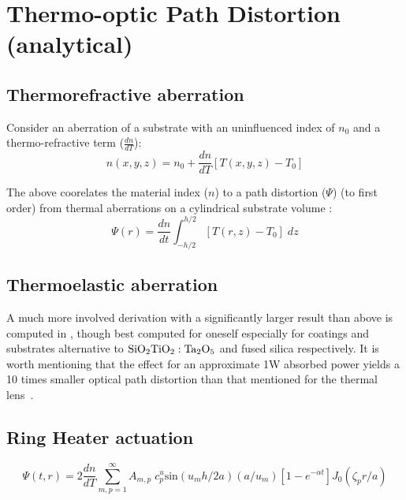 \section{Thermo-optic Path Distortion (analytical)}
\subsection{Thermorefractive aberration}
Consider an aberration of a substrate with an uninfluenced index of $n_0$ and a thermo-refractive term ($\frac{dn}{dT}$):
\begin{equation}
n(x,y,z) = n_0 + \frac{dn}{dT} [T(x,y,z) - T_0]
\end{equation}

The above coorelates the material index ($n$) to a path distortion ($\Psi$) (to first order) from thermal aberrations on a cylindrical substrate volume \cite{hellovinet:1990}:
\begin{equation}
    \Psi(r) = \frac{dn}{dt} \int^{h/2}_{-h/2} [T(r,z) - T_0] \;dz
\end{equation}

\subsection{Thermoelastic aberration}
A much more involved derivation with a significantly larger result than above is computed in \cite{hellovinet_te:1990}, though best computed for oneself especially for coatings and substrates alternative to $\mathrm{SiO_2}\mathrm{TiO_2:Ta_2O_5}$ and fused silica respectively. It is worth mentioning that the effect for an approximate 1W absorbed power yields a 10 times smaller optical path distortion than that mentioned for the thermal lens~\cite{hellovinet:1990}. 

\subsection{Ring Heater actuation}
\begin{equation}
	\Psi(t,r)=2\frac{dn}{dT} \sum^{\infty}_{m,p = 1} A_{m,p} \; c^{u}_{p} \mathrm{sin}(u_m h /2a) (a/u_m)[1-e^{-\alpha t}] J_0(\zeta_p r/a)
\end{equation}
~\cite{ramette:2016}

